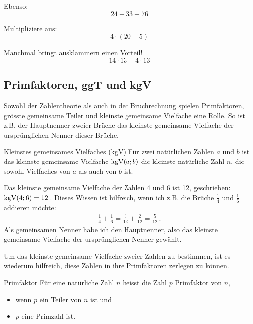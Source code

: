 \begin{example}
Ebenso:
\[
	24+33+76
\]
\end{example}

\begin{example}
Multipliziere aus:
\[
	4\cdot (20-5)
\]
\end{example}

\begin{example}
Manchmal bringt ausklammern einen Vorteil!
\[
	14\cdot 13 - 4\cdot 13
\]
\end{example}

\subsection{Primfaktoren, ggT und kgV}
Sowohl der Zahlentheorie als auch in der Bruchrechnung spielen Primfaktoren, grösste gemeinsame Teiler und kleinste gemeinsame Vielfache eine Rolle.
So ist z.B. der Hauptnenner zweier Brüche das kleinste gemeinsame Vielfache der ursprünglichen Nenner dieser Brüche.

\begin{defn}{Kleinstes gemeinsames Vielfaches (kgV)}
	Für zwei natürlichen Zahlen $a$ und $b$ ist das kleinste gemeinsame Vielfache $\mathrm{kgV}(a; b)$ die kleinste natürliche Zahl $n$, die sowohl Vielfaches von $a$ als auch von $b$ ist.
\end{defn}
\begin{example}
	Das kleinste gemeinsame Vielfache der Zahlen 4 und 6 ist 12, geschrieben: $\mathrm{kgV}(4; 6)=12$\,.
	Dieses Wissen ist hilfreich, wenn ich z.B. die Brüche $\frac{1}{4}$ und $\frac{1}{6}$ addieren möchte:
	\begin{align*}
		\frac{1}{4} + \frac{1}{6} = \frac{3}{12} + \frac{2}{12} = \frac{5}{12}\, .
	\end{align*}
	Als gemeinsamen Nenner habe ich den Hauptnenner, also das kleinste gemeinsame Vielfache der ursprünglichen Nenner gewählt.
\end{example}


Um das kleinste gemeinsame Vielfache zweier Zahlen zu bestimmen, ist es wiederum hilfreich, diese Zahlen in ihre Primfaktoren zerlegen zu können.

\begin{defn}{Primfaktor}
	Für eine natürliche Zahl $n$ heisst die Zahl $p$ Primfaktor von $n$,
	\begin{itemize}\setlength\itemsep{0pt}
		\item wenn $p$ ein Teiler von $n$ ist und
		\item $p$ eine Primzahl ist.
	\end{itemize}
\end{defn}

